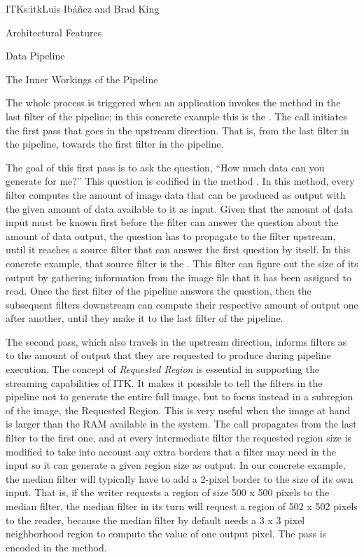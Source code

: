 \begin{aosachapter}{ITK}{s:itk}{Luis Ib\'{a}\~{n}ez and Brad King}
\begin{aosasect1}{Architectural Features}
\begin{aosasect2}{Data Pipeline}
\begin{aosasect3}{The Inner Workings of the Pipeline}

The whole process is triggered when an application invokes the 
method in the last filter of the pipeline; in this concrete example this is
the . The  call initiates the first pass
that goes in the upstream direction. That is, from the last filter in the
pipeline, towards the first filter in the pipeline.

The goal of this first pass is to ask the question, ``How much data can
you generate for me?'' This question is codified in the method
. In this method, every filter computes the
amount of image data that can be produced as output with the given amount of
data available to it as input. Given that the amount of data input must be
known first before the filter can answer the question about the amount of data
output, the question has to propagate to the filter upstream, until it reaches
a source filter that can answer the first question by itself. In this concrete
example, that source filter is the . This filter can
figure out the size of its output by gathering information from the image file
that it has been assigned to read. Once the first filter of the pipeline
answers the question, then the subsequent filters downstream can compute their
respective amount of output one after another, until they make it to the last
filter of the pipeline.

The second pass, which also travels in the upstream direction, informs
filters as to the amount of output that they are requested to
produce during pipeline execution. The concept of \emph{Requested Region} is essential
in supporting the streaming capabilities of ITK. It makes it possible to tell the
filters in the pipeline not to generate the entire full image, but to focus
instead in a subregion of the image, the Requested Region. This is
very useful when the image at hand is larger than the RAM available in
the system. The call propagates from the last filter to the first one, and at
every intermediate filter the requested region size is modified to
take into account any extra borders that a filter may need in the input so it can
generate a given region size as output. In our concrete example, the
median filter will typically have to add a 2-pixel border to the size of its
own input. That is, if the writer requests a region of size 500 x 500 pixels to
the median filter, the median filter in its turn will request a region of 
502 x 502 pixels to the reader, because the median filter by default needs a
3 x 3 pixel neighborhood region to compute the value of one output pixel. The pass is
encoded in the  method.


\end{aosasect3}
\end{aosasect2}
\end{aosasect1}
\end{aosachapter}
